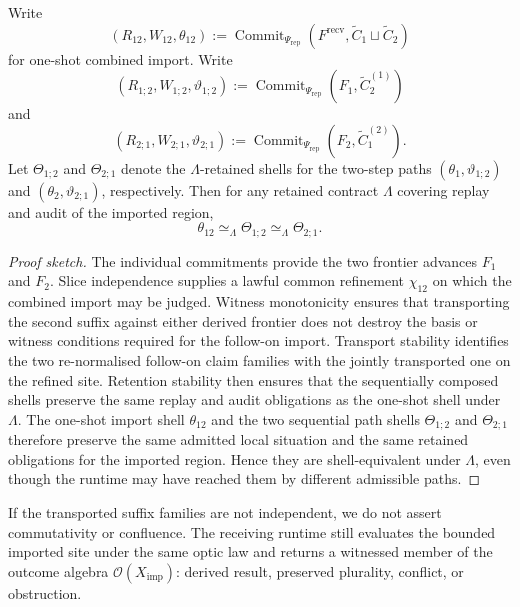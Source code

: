 \documentclass{aion}
\begin{document}
\begin{theorem}
	Write
	\[
		(R_{12}, W_{12}, \theta_{12})
		:=
		\operatorname{Commit}_{\Psi_{\mathrm{rep}}}
		(F^{\mathrm{recv}}, \widetilde{C}_1 \sqcup \widetilde{C}_2)
	\]
	for one-shot combined import. Write
	\[
		(R_{1;2}, W_{1;2}, \vartheta_{1;2})
		:=
		\operatorname{Commit}_{\Psi_{\mathrm{rep}}}
		(F_1, \widetilde{C}_2^{(1)})
	\]
	and
	\[
		(R_{2;1}, W_{2;1}, \vartheta_{2;1})
		:=
		\operatorname{Commit}_{\Psi_{\mathrm{rep}}}
		(F_2, \widetilde{C}_1^{(2)}).
	\]
	Let \(\Theta_{1;2}\) and \(\Theta_{2;1}\) denote the \(\Lambda\)-retained shells
	for the two-step paths \((\theta_1, \vartheta_{1;2})\) and
	\((\theta_2, \vartheta_{2;1})\), respectively. Then for any retained contract
	\(\Lambda\) covering replay and audit of the imported region,
	\[
		\theta_{12}
		\simeq_{\Lambda}
		\Theta_{1;2}
		\simeq_{\Lambda}
		\Theta_{2;1}.
	\]
\end{theorem}

\begin{proof}[Proof sketch]
	The individual commitments provide the two frontier advances \(F_1\) and
	\(F_2\). Slice independence supplies a lawful common refinement
	\(\chi_{12}\) on which the combined import may be judged. Witness monotonicity
	ensures that transporting the second suffix against either derived frontier
	does not destroy the basis or witness conditions required for the follow-on
	import. Transport stability identifies the two re-normalised follow-on claim
	families with the jointly transported one on the refined site. Retention
	stability then ensures that the sequentially composed shells preserve the same
	replay and audit obligations as the one-shot shell under \(\Lambda\). The
	one-shot import shell \(\theta_{12}\) and the two sequential path shells
	\(\Theta_{1;2}\) and \(\Theta_{2;1}\) therefore preserve the same admitted
	local situation and the same retained obligations for the imported region.
	Hence they are shell-equivalent under \(\Lambda\), even though the runtime may
	have reached them by different admissible paths.
\end{proof}

\begin{corollary}
\label{cor:non-independent-suffixes}
	If the transported suffix families are not independent, we do not
	assert commutativity or confluence. The receiving runtime still evaluates the
	bounded imported site under the same optic law and returns a witnessed member
	of the outcome algebra
	\(\mathcal{O}(X_{\mathrm{imp}})\): derived result, preserved plurality,
	conflict, or obstruction.
\end{corollary}
\end{document}
